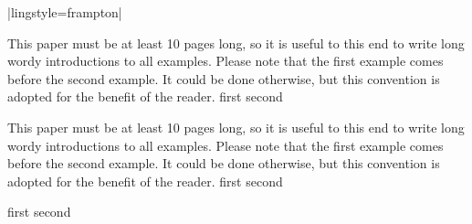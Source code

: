 \bullsec |lingstyle=frampton|


\pex[exno=65,preambleanchor=text,preambleoffset=0pt]
This paper must be at least 10 pages long,
so it is useful to this end to write long wordy introductions to
all examples.  Please note that the first example comes before
the second example.  It could be done otherwise, but this
convention is adopted for the benefit of the reader.
\a first
\a second
\xe

\pex[exno=65,preambleanchor=labelleft,preambleoffset=0pt]
This paper must be at least 10 pages long,
so it is useful to this end to write long wordy introductions to
all examples.  Please note that the first example comes before
the second example.  It could be done otherwise, but this
convention is adopted for the benefit of the reader.
\a first
\a second
\xe

\pex[exno=65,preambleanchor=labelleft,preambleoffset=0pt]
\a first
\a second
\xe

